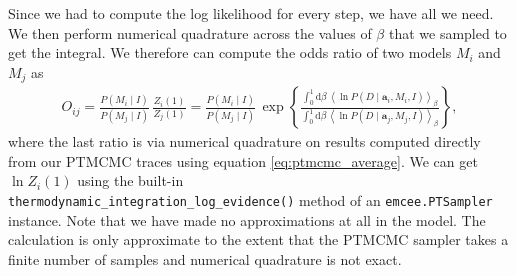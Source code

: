 Since we had to compute the log likelihood for every step, we have all
we need.  We then perform numerical quadrature across the
values of $\beta$ that we sampled to get the integral.  We therefore
can compute the odds ratio of two models $M_i$ and $M_j$ as
\begin{align}
O_{ij} = \frac{P(M_i\mid I)}{P(M_j\mid I)}\,\frac{Z_i(1)}{Z_j(1)}
= \frac{P(M_i\mid I)}{P(M_j\mid I)}\,\exp\left\{\frac{\int_0^1\mathrm{d}\beta\,\left\langle \ln P(D\mid \mathbf{a}_i, M_i, I)\right\rangle_\beta}{\int_0^1\mathrm{d}\beta\,\left\langle \ln P(D\mid \mathbf{a}_j, M_j, I)\right\rangle_\beta}\right\},
\end{align}
where the last ratio is via numerical quadrature on results computed
directly from our \mbox{PTMCMC} traces using equation
\eqref{eq:ptmcmc_average}.  We can get $\ln Z_i(1)$ using the built-in\\
\verb|thermodynamic_integration_log_evidence()| method of an
\texttt{emcee.PTSampler} instance. Note that we have made no approximations at all in the model. The calculation is only approximate to the extent that the PTMCMC sampler takes a finite number of samples and numerical quadrature is not exact.
